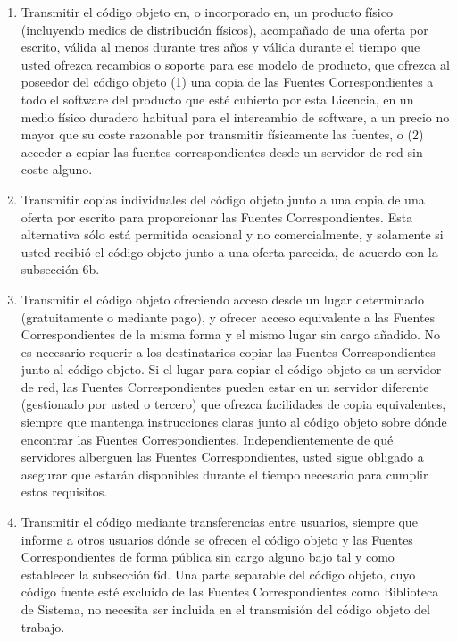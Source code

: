 \begin{enumerate}
\begin{enumerate}
		\item Transmitir el código objeto en, o incorporado en, un producto físico (incluyendo medios de distribución físicos), acompañado de una oferta por escrito, válida al menos durante tres años y válida durante el tiempo que usted ofrezca recambios o soporte para ese modelo de producto, que ofrezca al poseedor del código objeto (1) una copia de las Fuentes Correspondientes a todo el software del producto que esté cubierto por esta Licencia, en un medio físico duradero habitual para el intercambio de software, a un precio no mayor que su coste razonable por transmitir físicamente las fuentes, o (2) acceder a copiar las fuentes correspondientes desde un servidor de red sin coste alguno.\\
		
		\item Transmitir copias individuales del código objeto junto a una copia de una oferta por escrito para proporcionar las Fuentes Correspondientes. Esta alternativa sólo está permitida ocasional y no comercialmente, y solamente si usted recibió el código objeto junto a una oferta parecida, de acuerdo con la subsección 6b.\\
		
		\item Transmitir el código objeto ofreciendo acceso desde un lugar determinado (gratuitamente o mediante pago), y ofrecer acceso equivalente a las Fuentes Correspondientes de la misma forma y el mismo lugar sin cargo añadido. No es necesario requerir a los destinatarios copiar las Fuentes Correspondientes junto al código objeto. Si el lugar para copiar el código objeto es un servidor de red, las Fuentes Correspondientes pueden estar en un servidor diferente (gestionado por usted o tercero) que ofrezca facilidades de copia equivalentes, siempre que mantenga instrucciones claras junto al código objeto sobre dónde encontrar las Fuentes Correspondientes. Independientemente de qué servidores alberguen las Fuentes Correspondientes, usted sigue obligado a asegurar que estarán disponibles durante el tiempo necesario para cumplir estos requisitos.\\
		
		\item Transmitir el código mediante transferencias entre usuarios, siempre que informe a otros usuarios dónde se ofrecen el código objeto y las Fuentes Correspondientes de forma pública sin cargo alguno bajo tal y como establecer la subsección 6d. Una parte separable del código objeto, cuyo código fuente esté excluido de las Fuentes Correspondientes como Biblioteca de Sistema, no necesita ser incluida en el transmisión del código objeto del trabajo.\\
		

\end{enumerate}
\end{enumerate}
